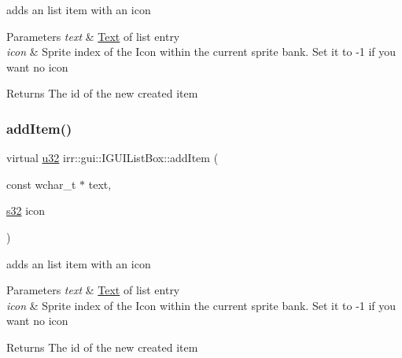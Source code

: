 adds an list item with an icon 


\begin{DoxyParams}{Parameters}
{\em text} & \hyperlink{classText}{Text} of list entry \\
\hline
{\em icon} & Sprite index of the Icon within the current sprite bank. Set it to -\/1 if you want no icon \\
\hline
\end{DoxyParams}
\begin{DoxyReturn}{Returns}
The id of the new created item 
\end{DoxyReturn}
\mbox{\label{classirr_1_1gui_1_1IGUIListBox_a2cfc2ff5f8f5114a92bd3618e79327e0}} 
\subsubsection{\texorpdfstring{add\+Item()}{addItem()}\hspace{0.1cm}{\footnotesize\ttfamily [2/2]}}
{\footnotesize\ttfamily virtual \hyperlink{namespaceirr_a0416a53257075833e7002efd0a18e804}{u32} irr\+::gui\+::\+I\+G\+U\+I\+List\+Box\+::add\+Item (\begin{DoxyParamCaption}\item[{const wchar\+\_\+t $\ast$}]{text,  }\item[{\hyperlink{namespaceirr_ac66849b7a6ed16e30ebede579f9b47c6}{s32}}]{icon }\end{DoxyParamCaption})\hspace{0.3cm}{\ttfamily [pure virtual]}}



adds an list item with an icon 


\begin{DoxyParams}{Parameters}
{\em text} & \hyperlink{classText}{Text} of list entry \\
\hline
{\em icon} & Sprite index of the Icon within the current sprite bank. Set it to -\/1 if you want no icon \\
\hline
\end{DoxyParams}
\begin{DoxyReturn}{Returns}
The id of the new created item 
\end{DoxyReturn}
\mbox{\label{classirr_1_1gui_1_1IGUIListBox_a8e1fe86805d9b970b89878291f0ccd25}} 
